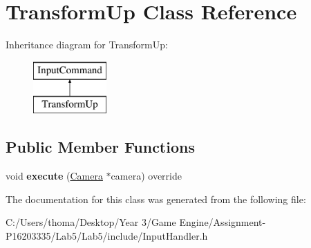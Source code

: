 \hypertarget{class_transform_up}{}\section{Transform\+Up Class Reference}
\label{class_transform_up}
Inheritance diagram for Transform\+Up\+:\begin{figure}[H]
\begin{center}
\leavevmode
\includegraphics[height=2.000000cm]{class_transform_up}
\end{center}
\end{figure}
\subsection*{Public Member Functions}
\begin{DoxyCompactItemize}
\item 
\mbox{\label{class_transform_up_a62c55fc86164103b02a6960aca716776}} 
void {\bfseries execute} (\mbox{\hyperlink{class_camera}{Camera}} $\ast$camera) override
\end{DoxyCompactItemize}


The documentation for this class was generated from the following file\+:\begin{DoxyCompactItemize}
\item 
C\+:/\+Users/thoma/\+Desktop/\+Year 3/\+Game Engine/\+Assignment-\/\+P16203335/\+Lab5/\+Lab5/include/Input\+Handler.\+h\end{DoxyCompactItemize}
